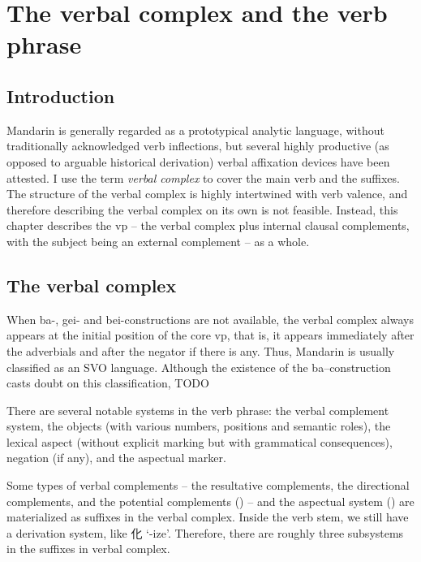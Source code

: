 \documentclass[UTF8, a4paper, oneside, scheme=plain]{ctexrep}
\newcommand*{\term}[1]{\emph{#1}}
\newcommand{\translate}[1]{`#1'}
\begin{document}
\chapter{The verbal complex and the verb phrase}\label{chap:verbal-complex}

\section{Introduction}

Mandarin is generally regarded as a prototypical analytic language,
without traditionally acknowledged verb inflections,
but several highly productive (as opposed to arguable historical derivation) 
verbal affixation devices have been attested.
I use the term \term{verbal complex} to cover 
the main verb and the suffixes.
The structure of the verbal complex is highly intertwined 
with verb valence, 
and therefore describing the verbal complex on its own 
is not feasible.
Instead, this chapter describes the \acs{vp} 
-- the verbal complex plus internal clausal complements, 
with the subject being an external complement --
as a whole.

\section{The verbal complex}

When ba-, gei- and bei-constructions are not available,
the verbal complex always appears at the initial position 
of the core \acs{vp}, 
that is, it appears immediately after the adverbials 
and after the negator if there is any. 
Thus, Mandarin is usually classified as an SVO language.
Although the existence of the ba--construction
casts doubt on this classification, 
TODO

There are several notable systems in the verb phrase: 
the verbal complement system, 
the objects (with various numbers, positions and semantic roles), 
the lexical aspect (without explicit marking but with grammatical consequences), 
negation (if any), 
and the aspectual marker. 

Some types of verbal complements -- the resultative complements, the directional complements, 
and the potential complements () --
and the aspectual system ()
are materialized as suffixes in the verbal complex.
Inside the verb stem, 
we still have a derivation system, 
like 化 \translate{-ize}.
Therefore, there are roughly three subsystems 
in the suffixes in verbal complex.
\end{document}
